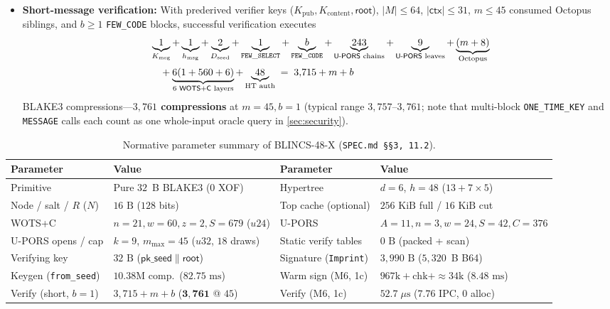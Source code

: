 \documentclass[11pt,a4paper]{article}
\theoremstyle{definition}
\theoremstyle{remark}
\newcommand{\BLINCS}{\textsf{BLINCS-48-X}}
\newcommand{\WOTSC}{\textsf{WOTS+C}}
\newcommand{\UPORS}{\textsf{U-PORS}}
\newcommand{\BLAKE}{\textsf{BLAKE3}}
\begin{document}
\begin{itemize}[leftmargin=1.4em,itemsep=1pt]
  \item \textbf{Short-message verification:} With prederived verifier keys ($K_{\mathrm{pub}}, K_{\mathrm{content}}, \mathsf{root}$), $|M| \le 64$, $|\mathsf{ctx}| \le 31$, $m \le 45$ consumed Octopus siblings, and $b \ge 1$ \texttt{FEW\_CODE} blocks, successful verification executes
    \begin{align*}
      &\underbrace{1}_{K_{\mathrm{msg}}} + \underbrace{1}_{h_{\mathrm{msg}}} + \underbrace{2}_{D_{\mathrm{seed}}} + \underbrace{1}_{\mathtt{FEW\_SELECT}} + \underbrace{b}_{\mathtt{FEW\_CODE}}
      + \underbrace{243}_{\text{\UPORS{} chains}} + \underbrace{9}_{\text{\UPORS{} leaves}} + \underbrace{(m + 8)}_{\text{Octopus}} \\
      &\quad + \underbrace{6(1 + 560 + 6)}_{\text{6 \WOTSC{} layers}} + \underbrace{48}_{\text{HT auth}}
      \;=\; 3{,}715 + m + b
    \end{align*}
    \BLAKE{} compressions---\textbf{$3{,}761$ compressions} at $m = 45, b = 1$ (typical range $3{,}757$--$3{,}761$; note that multi-block \texttt{ONE\_TIME\_KEY} and \texttt{MESSAGE} calls each count as one whole-input oracle query in \cref{sec:security}).
\end{itemize}

\begin{table}[t]
\centering
\footnotesize
\setlength{\tabcolsep}{3.5pt}
\caption{Normative parameter summary of \BLINCS{} (\texttt{SPEC.md §§3, 11.2}).}
\label{tab:params}
\begin{tabular}{@{}llll@{}}
\toprule
Parameter & Value & Parameter & Value \\
\midrule
Primitive & Pure $32$~B \BLAKE{} ($0$ XOF) & Hypertree & $d{=}6$, $h{=}48$ ($13{+}7{\times}5$) \\
Node / salt / $R$ ($N$) & $16\text{ B}$ ($128$ bits) & Top cache (optional) & $256\text{ KiB}$ full / $16\text{ KiB}$ cut \\
\WOTSC{} & $n{=}21, w{=}60, z{=}2, S{=}679$ ($u24$) & \UPORS{} & $A{=}11, n{=}3, w{=}24, S{=}42, C{=}376$ \\
\UPORS{} opens / cap & $k{=}9$, $m_{\max}{=}45$ ($u32$, $18$ draws) & Static verify tables & \textbf{$0\text{ B}$} (packed + scan) \\
Verifying key & $32\text{ B}$ ($\mathsf{pk\_seed} \parallel \mathsf{root}$) & Signature (\texttt{Imprint}) & \textbf{$3{,}990\text{ B}$} ($5{,}320$~B B64) \\
Keygen (\texttt{from\_seed}) & $10.38\text{M}$ comp.\ ($82.75\text{ ms}$) & Warm sign (M6, 1c) & $967\text{k}{+}\text{chk}{+}{\approx}34\text{k}$ ($8.48\text{ ms}$) \\
Verify (short, $b{=}1$) & $3{,}715{+}m{+}b$ ($\mathbf{3{,}761}$ @ $45$) & Verify (M6, 1c) & $52.7\;\mu\text{s}$ ($7.76$ IPC, $0$ alloc) \\
\bottomrule
\end{tabular}
\end{table}
\end{document}

